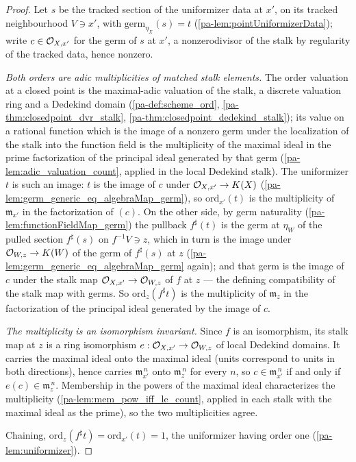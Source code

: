 \begin{proof}
  \leanok
  Let \(s\) be the tracked section of the uniformizer data at \(x'\), on its tracked
  neighbourhood \(V \ni x'\), with \(\mathrm{germ}_{\eta_X}(s) = t\)
  (\ref{pa-lem:pointUniformizerData}); write \(c \in \mathcal{O}_{X,x'}\) for the germ of
  \(s\) at \(x'\), a nonzerodivisor of the stalk by regularity of the tracked data,
  hence nonzero.

  \emph{Both orders are adic multiplicities of matched stalk elements.} The order
  valuation at a closed point is the maximal-adic valuation of the stalk, a discrete
  valuation ring and a Dedekind domain (\ref{pa-def:scheme_ord},
  \ref{pa-thm:closedpoint_dvr_stalk}, \ref{pa-thm:closedpoint_dedekind_stalk}); its value on
  a rational function which is the image of a nonzero germ under the localization of
  the stalk into the function field is the multiplicity of the maximal ideal in the
  prime factorization of the principal ideal generated by that germ
  (\ref{pa-lem:adic_valuation_count}, applied in the local Dedekind stalk). The
  uniformizer \(t\) is such an image: \(t\) is the image of \(c\) under
  \(\mathcal{O}_{X,x'} \to K(X)\) (\ref{pa-lem:germ_generic_eq_algebraMap_germ}), so
  \(\mathrm{ord}_{x'}(t)\) is the multiplicity of \(\mathfrak m_{x'}\) in the
  factorization of \((c)\). On the other side, by germ naturality
  (\ref{pa-lem:functionFieldMap_germ}) the pullback \(f^{\sharp}(t)\) is the germ at
  \(\eta_W\) of the pulled section \(f^{\sharp}(s)\) on \(f^{-1}V \ni z\), which in
  turn is the image under \(\mathcal{O}_{W,z} \to K(W)\) of the germ of \(f^{\sharp}(s)\)
  at \(z\) (\ref{pa-lem:germ_generic_eq_algebraMap_germ} again); and that germ is the
  image of \(c\) under the stalk map \(\mathcal{O}_{X,x'} \to \mathcal{O}_{W,z}\) of \(f\) at
  \(z\) --- the defining compatibility of the stalk map with germs. So
  \(\mathrm{ord}_z(f^{\sharp}t)\) is the multiplicity of \(\mathfrak m_z\) in the
  factorization of the principal ideal generated by the image of \(c\).

  \emph{The multiplicity is an isomorphism invariant.} Since \(f\) is an isomorphism,
  its stalk map at \(z\) is a ring isomorphism \(e : \mathcal{O}_{X,x'} \to \mathcal{O}_{W,z}\)
  of local Dedekind domains. It carries the maximal ideal onto the maximal ideal
  (units correspond to units in both directions), hence carries
  \(\mathfrak m_{x'}^{\,n}\) onto \(\mathfrak m_z^{\,n}\) for every \(n\), so
  \(c \in \mathfrak m_{x'}^{\,n}\) if and only if \(e(c) \in \mathfrak m_z^{\,n}\).
  Membership in the powers of the maximal ideal characterizes the multiplicity
  (\ref{pa-lem:mem_pow_iff_le_count}, applied in each stalk with the maximal ideal as the
  prime), so the two multiplicities agree.

  Chaining, \(\mathrm{ord}_z(f^{\sharp}t) = \mathrm{ord}_{x'}(t) = 1\), the
  uniformizer having order one (\ref{pa-lem:uniformizer}).
\end{proof}

